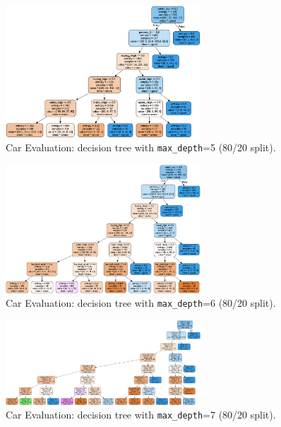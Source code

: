 \begin{figure}[H]
	\centering
	\includegraphics[width=0.65\textwidth]{imgs/dt-mini/dt__car_evaluation__80_vs_20__5.png}
	\caption{Car Evaluation: decision tree with \texttt{max\_depth}=5 (80/20 split).}\label{fig:ce-dt-depth-5}
\end{figure}

\begin{figure}[H]
	\centering
	\includegraphics[width=0.65\textwidth]{imgs/dt-mini/dt__car_evaluation__80_vs_20__6.png}
	\caption{Car Evaluation: decision tree with \texttt{max\_depth}=6 (80/20 split).}\label{fig:ce-dt-depth-6}
\end{figure}

\begin{figure}[H]
	\centering
	\includegraphics[width=0.65\textwidth]{imgs/dt-mini/dt__car_evaluation__80_vs_20__7.png}
	\caption{Car Evaluation: decision tree with \texttt{max\_depth}=7 (80/20 split).}\label{fig:ce-dt-depth-7}
\end{figure}


